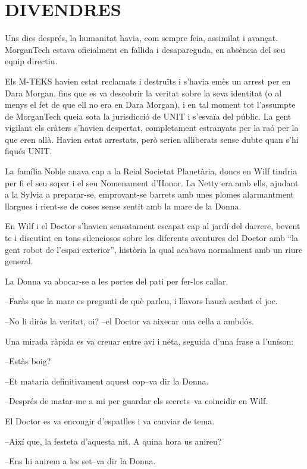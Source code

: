 \chapter*{DIVENDRES}

Uns dies després, la humanitat havia, com sempre feia, assimilat i
avançat. MorganTech estava oficialment en fallida i desapareguda, en
absència del seu equip directiu.

Els M-TEKS havien estat reclamats i destruïts i s'havia emès un arrest
per en Dara Morgan, fins que es va descobrir la veritat sobre la seva
identitat (o al menys el fet de que ell no era en Dara Morgan), i en tal
moment tot l'assumpte de MorganTech queia sota la jurisdicció de UNIT i
s'esvaïa del públic. La gent vigilant els cràters s'havien despertat,
completament estranyats per la raó per la que eren allà. Havien estat
arrestats, però serien alliberats sense dubte quan s'hi fiqués UNIT.

La família Noble anava cap a la Reial Societat Planetària, doncs en Wilf
tindria per fi el seu sopar i el seu Nomenament d'Honor. La Netty era
amb ells, ajudant a la Sylvia a preparar-se, emprovant-se barrets amb
unes plomes alarmantment llargues i rient-se de coses sense sentit amb
la mare de la Donna.

En Wilf i el Doctor s'havien sensatament escapat cap al jardí del
darrere, bevent te i discutint en tons silenciosos sobre les diferents
aventures del Doctor amb ``la gent robot de l'espai exterior'', història
la qual acabava normalment amb un riure general.

La Donna va abocar-se a les portes del pati per fer-los callar.

--Faràs que la mare es pregunti de què parleu, i llavors haurà acabat el
joc.

--No li diràs la veritat, oi? --el Doctor va aixecar una cella a ambdós.

Una mirada ràpida es va creuar entre avi i néta, seguida d'una frase a
l'uníson:

--Estàs boig?

--Et mataria definitivament aquest cop--va dir la Donna.

--Després de matar-me a mi per guardar els secrets--va coincidir en
Wilf.

El Doctor es va encongir d'espatlles i va canviar de tema.

--Així que, la festeta d'aquesta nit. A quina hora us anireu?

--Ens hi anirem a les set--va dir la Donna.

